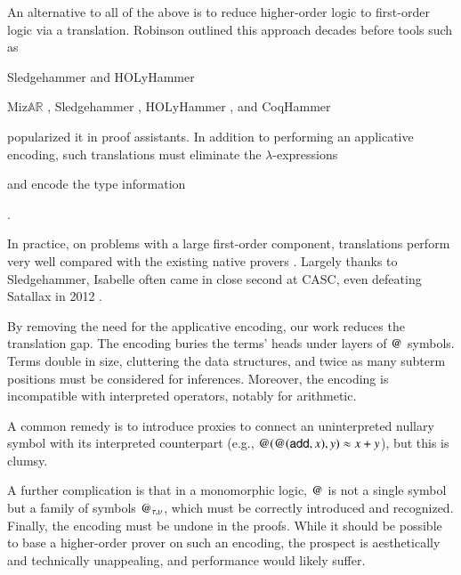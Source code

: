   
  An alternative to all of the above is to reduce higher-order logic to first-order
  logic via a translation. Robinson \cite{ar-70-hol}
  outlined this approach decades before tools such as
  \begin{conf}Sledgehammer \cite{pb-12-sh} and
  HOLyHammer \cite{ku-15-holyhammer}\end{conf}%
  \begin{rep}Miz$\mathbb{AR}$ \cite{urs-13-atp},
  Sledgehammer \cite{pb-12-sh},
  HOLyHammer \cite{ku-15-holyhammer}, and
  CoqHammer \cite{ck-18-coqhammer}\end{rep}
  popularized it in proof assistants.
  In addition to performing an applicative encoding, such translations must
  eliminate the \hbox{$\lambda$-expressions}\begin{rep}
  \cite{mp-08-trans,lc-16-lam-trans}\end{rep} and encode the type
  information\begin{rep} \cite{bkpu-16-hammering-types}\end{rep}.
  \begin{rep}%
  In practice, on problems with a large first-order component, translations
  perform very well compared with the existing native provers
  \cite{ns-13-leo2sh}. Largely thanks to Sledgehammer, Isabelle often came
  in close second at CASC, even defeating Satallax in 2012
  \cite{gs-13-cascj6}.
  \end{rep}
  
  By removing the need for the applicative encoding, our work reduces
  the translation gap. The encoding buries the \lfhol{} terms' heads under
  layers of $\mathsf{@}$ symbols. %
  Terms double in size, cluttering the data structures, and twice as many
  subterm positions must be considered for inferences. Moreover, the encoding is
  incompatible with interpreted operators, notably for arithmetic.
  \begin{rep}A common remedy is to introduce proxies to connect an
  uninterpreted nullary symbol with its interpreted counterpart
  (e.g., %
  $\mathsf{@}(\mathsf{@}(\mathsf{add}, x), y) \approx x + y$), but this is clumsy. \end{rep}A further
  complication is that in a monomorphic logic, $\mathsf{@}$ is not a single symbol
  but a family of symbols $\mathsf{@}_{\tau,\upsilon}$, which must be
  correctly introduced and recognized. Finally, the encoding must be undone in
  the proofs. While it should be possible to base a higher-order
  prover on such an encoding, the prospect is aesthetically and
  technically unappealing, and performance would likely suffer.
  

